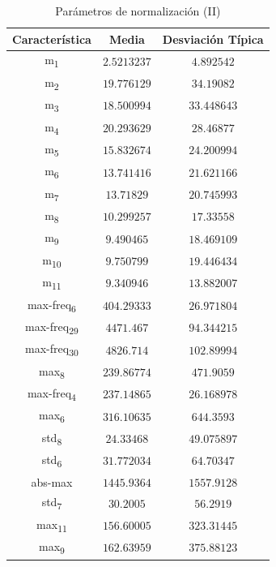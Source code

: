 \documentclass[12pt]{article}
\begin{document}
\begin{table}
	\caption{Parámetros de normalización (II)}
	\centering
		\begin{tabular}{||c c c||}
			\hline
			Característica & Media & Desviación Típica  \\ [0.5ex]
			\hline\hline
			m\textsubscript{1} & $2.5213237$ & $4.892542$ \\
			\hline
			m\textsubscript{2} & $19.776129$ & $34.19082$ \\
			\hline
			m\textsubscript{3} & $18.500994$ & $33.448643$ \\
			\hline
			m\textsubscript{4} & $20.293629$ & $28.46877$ \\
			\hline
			m\textsubscript{5} & $15.832674$ & $24.200994$ \\
			\hline
			m\textsubscript{6} & $13.741416$ & $21.621166$ \\
			\hline
			m\textsubscript{7} & $13.71829$ & $20.745993$ \\
			\hline
			m\textsubscript{8} & $10.299257$ & $17.33558$ \\
			\hline
			m\textsubscript{9} & $9.490465$ & $18.469109$ \\
			\hline
			m\textsubscript{10} & $9.750799$ & $19.446434$ \\
			\hline
			m\textsubscript{11} & $9.340946$ & $13.882007$ \\
			\hline
			max-freq\textsubscript{6} & $404.29333$ & $26.971804$ \\
			\hline
			max-freq\textsubscript{29} & $4471.467$ & $94.344215$ \\
			\hline
			max-freq\textsubscript{30} & $4826.714$ & $102.89994$ \\
			\hline
			max\textsubscript{8} & $239.86774$ & $471.9059$ \\
			\hline
			max-freq\textsubscript{4} & $237.14865$ & $26.168978$ \\
			\hline
			max\textsubscript{6} & $316.10635$ & $644.3593$ \\
			\hline
			std\textsubscript{8} & $24.33468$ & $49.075897$ \\
			\hline
			std\textsubscript{6} & $31.772034$ & $64.70347$ \\
			\hline
			abs-max & $1445.9364$ & $1557.9128$ \\
			\hline
			std\textsubscript{7} & $30.2005$ & $56.2919$ \\
			\hline
			max\textsubscript{11} & $156.60005$ & $323.31445$ \\
			\hline
			max\textsubscript{9} & $162.63959$ & $375.88123$ \\
			\hline
		\end{tabular}
	\label{Tab:Features_5_2}
\end{table}
\end{document}
